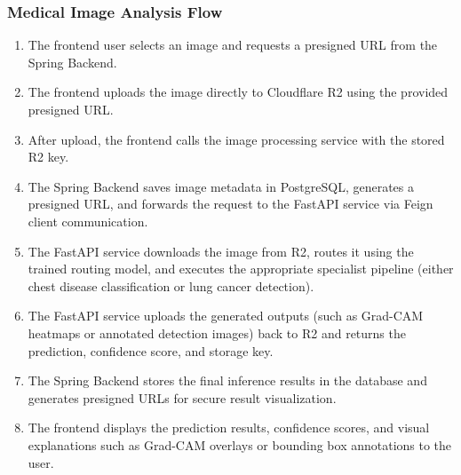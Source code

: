 \subsubsection{Medical Image Analysis Flow}
\begin{enumerate}
	\item The frontend user selects an image and requests a presigned URL from the Spring Backend.
	
	\item The frontend uploads the image directly to Cloudflare R2 using the provided presigned URL.
	
	\item After upload, the frontend calls the image processing service with the stored R2 key.
	
	\item The Spring Backend saves image metadata in PostgreSQL, generates a presigned URL, and forwards the request to the FastAPI service via Feign client communication.
	
	\item The FastAPI service downloads the image from R2, routes it using the trained routing model, and executes the appropriate specialist pipeline (either chest disease classification or lung cancer detection).
	
	\item The FastAPI service uploads the generated outputs (such as Grad-CAM heatmaps or annotated detection images) back to R2 and returns the prediction, confidence score, and storage key.
	
	\item The Spring Backend stores the final inference results in the database and generates presigned URLs for secure result visualization.
	
	\item The frontend displays the prediction results, confidence scores, and visual explanations such as Grad-CAM overlays or bounding box annotations to the user.
\end{enumerate}

